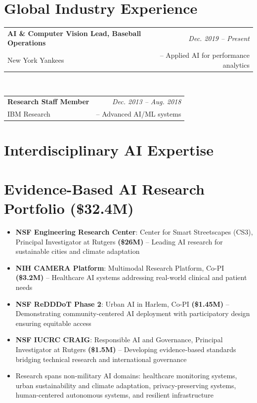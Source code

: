 \documentclass[11pt,letterpaper]{article}
\makeatletter
\newcommand{\profentry}[4]{
    \begin{tabularx}{\textwidth}{@{}X r@{}}
        \textbf{\color{darkGray}#1} & \textcolor{mediumGray}{\textit{#2}} \\
        \textcolor{mediumGray}{#3} & #4
    \end{tabularx}
}
\newcommand{\listentry}[1]{
    \item[\textcolor{accentBlue}{\small\faAngleRight}] #1
}
\makeatother
\begin{document}
\section{Global Industry Experience}
\profentry{AI \& Computer Vision Lead, Baseball Operations}{Dec. 2019 -- Present}{New York Yankees}{-- Applied AI for performance analytics}\\[2pt]
\profentry{Research Staff Member}{Dec. 2013 -- Aug. 2018}{IBM Research}{-- Advanced AI/ML systems}

\section{Interdisciplinary AI Expertise}
\begin{center}
\end{center}

\section{Evidence-Based AI Research Portfolio (\$32.4M)}
\begin{itemize}
\listentry{\textbf{\color{UNBlue}NSF Engineering Research Center}: Center for Smart Streetscapes (CS3), Principal Investigator at Rutgers \textbf{(\$26M)} -- Leading AI research for sustainable cities and climate adaptation}
\listentry{\textbf{\color{UNBlue}NIH CAMERA Platform}: Multimodal Research Platform, Co-PI \textbf{(\$3.2M)} -- Healthcare AI systems addressing real-world clinical and patient needs}
\listentry{\textbf{\color{UNBlue}NSF ReDDDoT Phase 2}: Urban AI in Harlem, Co-PI \textbf{(\$1.45M)} -- Demonstrating community-centered AI deployment with participatory design ensuring equitable access}
\listentry{\textbf{\color{UNBlue}NSF IUCRC CRAIG}: Responsible AI and Governance, Principal Investigator at Rutgers \textbf{(\$1.5M)} -- Developing evidence-based standards bridging technical research and international governance}
\listentry{Research spans non-military AI domains: healthcare monitoring systems, urban sustainability and climate adaptation, privacy-preserving systems, human-centered autonomous systems, and resilient infrastructure}
\end{itemize}
\end{document}
